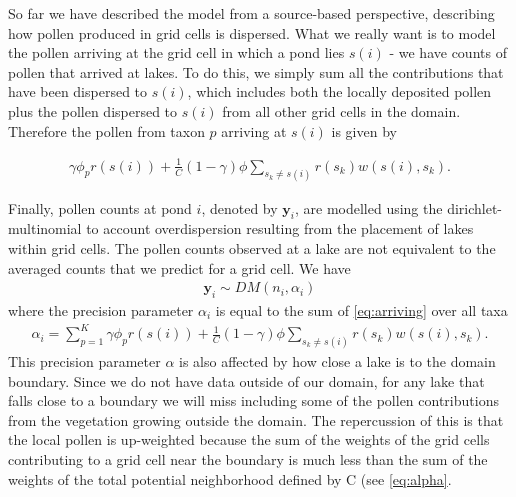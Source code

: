 \documentclass[12pt]{article}
\begin{document}


So far we have described the model from a source-based perspective,
describing how pollen produced in grid cells is dispersed. What we
really want is to model the pollen arriving at the grid cell in which
a pond lies $s(i)$ - we have counts of pollen that arrived at
lakes. To do this, we simply sum all the contributions that have been
dispersed to $s(i)$, which includes both the locally deposited pollen
plus the pollen dispersed to $s(i)$ from all other grid
cells in the domain. Therefore the pollen from taxon $p$ arriving at $s(i)$ is given
by

\begin{align}
\gamma \phi_p r(s(i)) + \frac{1}{C} (1-\gamma) \phi \sum_{s_k \neq s(i) } r(s_k) w(s(i), s_k).
\label{eq:arriving}
\end{align}

Finally, pollen counts at pond $i$, denoted by $\bm{y}_i$, are
modelled using the dirichlet-multinomial to account overdispersion
resulting from the placement of lakes within grid cells. The pollen
counts observed at a lake are not equivalent to the averaged counts
that we predict for a grid cell.  We have
\begin{align}
\bm{y}_i \sim DM (n_i, \alpha_i)
\label{eq:DM}
\end{align}
where the precision parameter $\alpha_i$ is equal to the sum of \ref{eq:arriving} over all taxa
\begin{align}
\alpha_i = \sum_{p=1}^K \gamma \phi_p r(s(i)) + \frac{1}{C} (1-\gamma) \phi \sum_{s_k \neq s(i) } r(s_k) w(s(i), s_k).
\label{eq:alpha}
\end{align}
This precision parameter $\alpha$ is also affected by how close a lake is to the domain boundary. Since we do not have data outside of our domain, for any lake that falls close to a boundary we will miss including some of the pollen contributions from the vegetation growing outside the domain. The repercussion of this is that the local pollen is up-weighted because the sum of the weights of the grid cells contributing to a grid cell near the boundary is much less than the sum of the weights of the total potential neighborhood defined by C (see \ref{eq:alpha}. 
\end{document}
